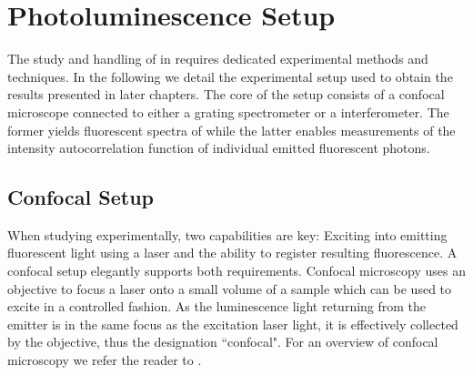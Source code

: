 
\chapter{Photoluminescence Setup}	\label{ch::pl_setup}

	The study and handling of \sivs in \nds requires dedicated experimental methods and techniques. In the following we detail the experimental setup used to obtain the results presented in later chapters. The core of the setup consists of a confocal microscope connected to either a grating spectrometer or a \HBT interferometer. The former yields fluorescent spectra of \sivs while the latter enables measurements of the intensity autocorrelation function of individual emitted fluorescent photons.

	\section{Confocal Setup} \label{sec::confocal}

		When studying \sivs experimentally, two capabilities are key: Exciting \sivs into emitting fluorescent light using a laser and the ability to register resulting \siv fluorescence. A confocal setup elegantly supports both requirements. Confocal microscopy uses an objective to focus a laser onto a small volume of a sample which can be used to excite \sivs in a controlled fashion. As the luminescence light returning from the emitter is in the same focus as the excitation laser light, it is effectively collected by the objective, thus the designation ``confocal". For an overview of confocal microscopy we refer the reader to \cite{webb1996confocal}.

